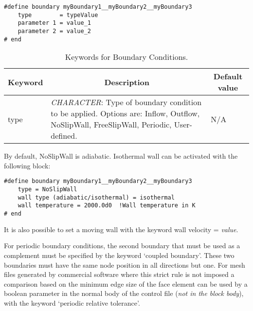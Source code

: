 \documentclass[a4paper,10pt]{report}
\begin{document}
\begin{lstlisting}
#define boundary myBoundary1__myBoundary2__myBoundary3
	type        = typeValue
	parameter 1 = value_1
	parameter 2 = value_2
# end
\end{lstlisting}


\begin{table}[h]
\caption{Keywords for Boundary Conditions.}\label{tab:BC}

\begin{tabular}{|p{4cm}|p{10cm}|p{2.2cm}|}
\hline
\multicolumn{1}{|c|}{\textbf{Keyword}} & \multicolumn{1}{c|}{\textbf{Description}} & \multicolumn{1}{c|}{\textbf{Default value}} \\ \hline

type 	&
		\textit{CHARACTER}: Type of boundary condition to be applied. Options are: Inflow, Outflow, NoSlipWall, FreeSlipWall, Periodic, User-defined. &
							N/A \\ \hline

\end{tabular}
\end{table}

By default, NoSlipWall is adiabatic. Isothermal wall can be activated with the following block:

\begin{lstlisting}
#define boundary myBoundary1__myBoundary2__myBoundary3
	type = NoSlipWall
	wall type (adiabatic/isothermal) = isothermal
	wall temperature = 2000.0d0  !Wall temperature in K
# end
\end{lstlisting}

It is also possible to set a moving wall with the keyword wall velocity = \emph{value}. 

For periodic boundary conditions, the second boundary that must be used as a complement must be specified by the keyword `coupled boundary'. These two boundaries must have the same node position in all directions but one. For mesh files generated by commercial software where this strict rule is not imposed a comparison based on the minimum edge size of the face element can be used by a boolean parameter in the normal body of the control file (\emph{not in the block body}), with the keyword `periodic relative tolerance'.

\vspace{0.5 in}
\end{document}
